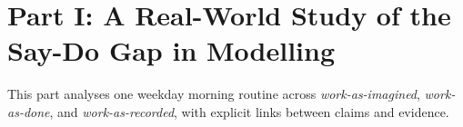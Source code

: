 \section{Part I: A Real-World Study of the Say-Do Gap in Modelling}
\label{sec:part1}

This part analyses one weekday morning routine across \textit{work-as-imagined}, \textit{work-as-done}, and \textit{work-as-recorded}, with explicit links between claims and evidence.





